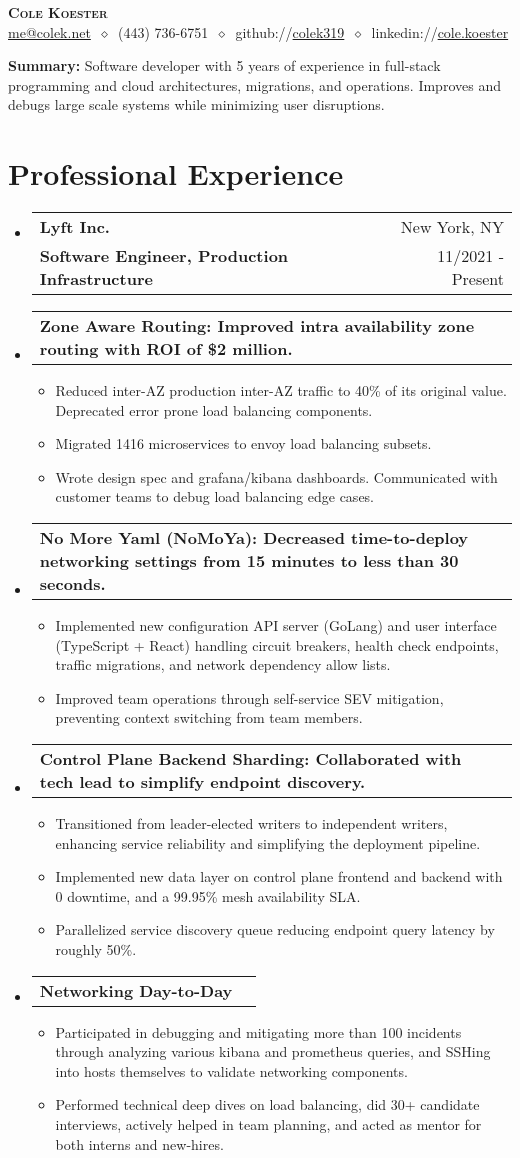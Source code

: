 \documentclass[letterpaper,11pt]{article}
\makeatletter
\newcommand{\cvitem}[1]{
  \item\small{
    {#1\vspace{-2pt}}
  }
}
\newcommand{\cvproject}[2]{
  \vspace{-4pt}\item
    \begin{tabular*}{\textwidth}[t]{l@{\extracolsep{\fill}}r}
      \textbf{\small#1} & \small #2 \\
    \end{tabular*}\vspace{-9pt}
}
\newcommand{\cvheading}[4]{
  \vspace{-2pt}\item
    \begin{tabular*}{\textwidth}[t]{l@{\extracolsep{\fill}}r}
      \textbf{#1} & #2 \\
      \small#3 & \small #4 \\
    \end{tabular*}\vspace{-9pt}
}
\newcommand{\cvheadingstart}{\begin{itemize}[leftmargin=0in, label={}]}
\newcommand{\cvheadingend}{\end{itemize}}
\newcommand{\cvitemstart}{\begin{itemize}\justifying}
\newcommand{\cvitemend}{\end{itemize}\vspace{-5pt}}
\makeatother
\begin{document}
\begin{center}
\textbf{\LARGE\scshape Cole Koester} \\
\vspace{1pt}\small
\href{mailto:}{me@colek.net}
$\ \diamond\ $
(443) 736-6751
$\ \diamond\ $
github://\href{https://github.com/}{colek319}
$\ \diamond\ $
linkedin://\href{https://www.linkedin.com/}{cole.koester}
\end{center}

\noindent\begin{minipage}{\textwidth}
\footnotesize
\textbf{Summary:} Software developer with 5 years of experience in full-stack programming and cloud architectures, migrations, and operations. Improves and debugs large scale systems while minimizing user disruptions.
\end{minipage}

\section{Professional Experience}
\cvheadingstart
  \cvheading
    {Lyft Inc.}{New York, NY}
    {\textbf{Software Engineer, Production Infrastructure}}{11/2021 - Present}
    \cvproject{Zone Aware Routing: Improved intra availability zone routing with ROI of \$2 million.}{}
    \cvitemstart
      \cvitem{Reduced inter-AZ production inter-AZ traffic to 40\% of its original value. Deprecated error prone load balancing components.}
      \cvitem{Migrated 1416 microservices to envoy load balancing subsets.}
      \cvitem{Wrote design spec and grafana/kibana dashboards. Communicated with customer teams to debug load balancing edge cases.}
    \cvitemend
    \cvproject{No More Yaml (NoMoYa): Decreased time-to-deploy networking settings from 15 minutes to less than 30 seconds.}{}
    \cvitemstart
      \cvitem{Implemented new configuration API server (GoLang) and user interface (TypeScript + React) handling circuit breakers, health check endpoints, traffic migrations, and network dependency allow lists.}
      \cvitem{Improved team operations through self-service SEV mitigation, preventing context switching from team members.}
    \cvitemend
    \cvproject{Control Plane Backend Sharding: Collaborated with tech lead to simplify endpoint discovery.}{}
    \cvitemstart
      \cvitem{Transitioned from leader-elected writers to independent writers, enhancing service reliability and simplifying the deployment pipeline.}
      \cvitem{Implemented new data layer on control plane frontend and backend with 0 downtime, and a 99.95\% mesh availability SLA.}
      \cvitem{Parallelized service discovery queue reducing endpoint query latency by roughly 50\%.}
    \cvitemend
    \cvproject{Networking Day-to-Day}{}
    \cvitemstart
      \cvitem{Participated in debugging and mitigating more than 100 incidents through analyzing various kibana and prometheus queries, and SSHing into hosts themselves to validate networking components.}
      \cvitem{Performed technical deep dives on load balancing, did 30+ candidate interviews, actively helped in team planning, and acted as mentor for both interns and new-hires.}
    \cvitemend
\cvheadingend
\end{document}

